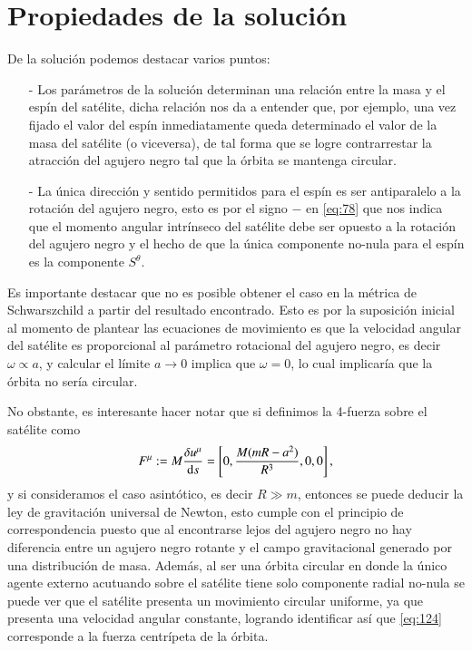 \section{Propiedades de la solución}

De la solución podemos destacar varios puntos:
\begin{itemize}
\item[-] Los parámetros de la solución determinan una relación entre la masa y el espín del satélite, dicha relación nos da a entender que, por ejemplo, una vez fijado el valor del espín inmediatamente queda determinado el valor de la masa del satélite (o viceversa), de tal forma que se logre contrarrestar la atracción del agujero negro tal que la órbita se mantenga circular.
\item[-] La única dirección y sentido permitidos para el espín es ser antiparalelo a la rotación del agujero negro, esto es por el signo $-$ en \eqref{eq:78} que nos indica que el momento angular intrínseco del satélite debe ser opuesto a la rotación del agujero negro y el hecho de que la única componente no-nula para el espín es la componente $S^{\theta}$.
\end{itemize}

Es importante destacar que no es posible obtener el caso en la métrica de Schwarszchild a partir del resultado encontrado. Esto es por la suposición inicial al momento de plantear las ecuaciones de movimiento es que la velocidad angular del satélite es proporcional al parámetro rotacional del agujero negro, es decir $\omega \propto a$, y calcular el límite $a \rightarrow 0$ implica que $\omega = 0$, lo cual implicaría que la órbita no sería circular.

No obstante, es interesante hacer notar que si definimos la 4-fuerza sobre el satélite como
\begin{equation}
\label{eq:124}
F^{\mu} := M \frac{\delta u^{\mu}}{\mathrm{d}s} = \left[ 0, \frac{M(mR-a^2)}{R^3},0,0 \right],
\end{equation}
y si consideramos el caso asintótico, es decir $R \gg m $, entonces se puede deducir la ley de gravitación universal de Newton, esto cumple con el principio de correspondencia puesto que al encontrarse lejos del agujero negro no hay diferencia entre un agujero negro rotante y el campo gravitacional generado por una distribución de masa. Además, al ser una órbita circular en donde la único agente externo acutuando sobre el satélite tiene solo componente radial no-nula se puede ver que el satélite presenta un movimiento circular uniforme, ya que presenta una velocidad angular constante, logrando identificar así que \eqref{eq:124} corresponde a la fuerza centrípeta de la órbita.

